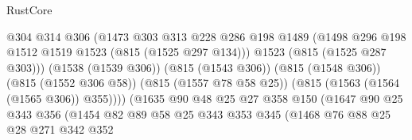 \begin{lexlean}{RustCore}
\begin{coremodule}
{\begin{coremodule}
{{{{{{                                        @304
                                        @314
                                        @306
                                        (@1473
                                          @303
                                          @313
                                          @228
                                          @286
                                          @198
                                          @1489
                                          (@1498
                                            @296
                                            @198
                                            @1512
                                            @1519
                                            @1523
                                            (@815 (@1525 @297 @134)))
                                          @1523
                                          (@815 (@1525 @287 @303)))
                                        (@1538 (@1539 @306))
                                        (@815 (@1543 @306))
                                        (@815 (@1548 @306))
                                        (@815 (@1552 @306 @58))
                                        (@815 (@1557 @78 @58 @25))
                                        (@815 (@1563 (@1564 (@1565 @306)) @355))))
                                    (@1635
                                      @90
                                      @48
                                      @25
                                      @27
                                      @358
                                      @150
                                      (@1647
                                        @90
                                        @25
                                        @343
                                        @356
                                        (@1454
                                          @82
                                          @89
                                          @58
                                          @25
                                          @343
                                          @353
                                          @345
                                          (@1468
                                            @76
                                            @88
                                            @25
                                            @28
                                            @271
                                            @342
                                            @352
}}}}}}
\end{coremodule}}
\end{coremodule}
\end{lexlean}
